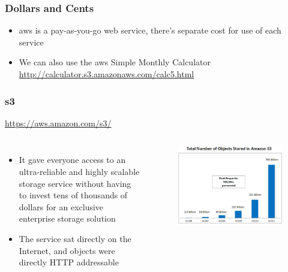 \documentclass{beamer}
\begin{document}
\begin{frame}
\frametitle{Dollars and Cents}
\begin{itemize}
\item \gls{aws} is a pay-as-you-go web service, there's separate cost for use of each service
\item We can also use the \gls{aws} Simple Monthly Calculator
\url{http://calculator.s3.amazonaws.com/calc5.html}
\end{itemize}
\end{frame}
\begin{frame}
\frametitle[\gls{s3}]{\acrfull{s3}}
\url{https://aws.amazon.com/s3/}
\begin{columns}
  \begin{itemize}
  \item It gave everyone access to an ultra-reliable and highly scalable storage service without having to invest tens of thousands of dollars for an exclusive enterprise storage solution
  \item The service sat directly on the Internet, and objects were directly HTTP addressable
  \end{itemize}
  \begin{figure}
	\includegraphics[width= 1.0 \textwidth]{aws-s3-growth.eps}
  \end{figure}
\end{columns}
\end{frame}
\end{document}
